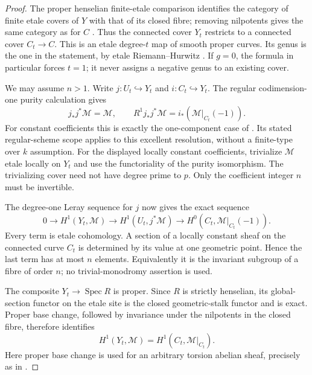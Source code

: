 \begin{proof}
The proper henselian finite-etale comparison identifies the
category of finite etale covers of $Y$ with that of its closed
fibre; removing nilpotents gives the same category as for $C$
\citep[Lemma 58.9.1, Tag 0A48, complete proof]
{StacksSemilinearDeterminantsB}. Thus the connected cover $Y_t$
restricts to a connected cover $C_t\to C$. This is an etale
degree-$t$ map of smooth proper curves. Its genus is the one in
the statement, by etale Riemann--Hurwitz
\citep[Section 53.12 and Lemma 53.12.2, Tags 0C1B and 0C1D]
{StacksSemilinearDeterminantsB}. If $g=0$, the formula in
particular forces $t=1$; it never assigns a negative genus to
an existing cover.

We may assume $n>1$. Write $j:U_t\hookrightarrow Y_t$ and
$i:C_t\hookrightarrow Y_t$. The regular codimension-one
purity calculation gives
\[
 j_*j^*\mathcal M=\mathcal M,\qquad
 R^1j_*j^*\mathcal M=i_*(\mathcal M|_{C_t}(-1)).          \tag{D.SD.3}
\]
For constant coefficients this is exactly the one-component
case of \citet[Expose XVI, Theorem 3.1.1 and
Corollary 3.1.3]{A_ILO2014}. Its stated regular-scheme scope
applies to this excellent resolution, without a finite-type
over $k$ assumption. For the displayed locally constant
coefficients, trivialize $\mathcal M$ etale locally on $Y_t$
and use the functoriality of the purity isomorphism. The
trivializing cover need not have degree prime to $p$.
Only the coefficient integer $n$ must be invertible.

The degree-one Leray sequence for $j$ now gives the exact sequence
\[
 0\longrightarrow H^1(Y_t,\mathcal M)
 \longrightarrow H^1(U_t,j^*\mathcal M)
 \longrightarrow H^0(C_t,\mathcal M|_{C_t}(-1)).          \tag{D.SD.4}
\]
Every term is etale cohomology. A section of a locally constant
sheaf on the connected curve $C_t$ is determined by its value
at one geometric point. Hence the last term has at most $n$
elements. Equivalently it is the invariant subgroup of a fibre
of order $n$; no trivial-monodromy assertion is used.

The composite $Y_t\to\operatorname{Spec}R$ is proper.
Since $R$ is strictly henselian, its global-section functor
on the etale site is the closed geometric-stalk functor and
is exact. Proper base change, followed by invariance under
the nilpotents in the closed fibre, therefore identifies
\[
          H^1(Y_t,\mathcal M)
             =H^1(C_t,\mathcal M|_{C_t}).                \tag{D.SD.5}
\]
Here proper base change is used for an arbitrary torsion
abelian sheaf, precisely as in
\citep[Theorem 59.91.11, Tag 095T, complete proof]
{StacksSemilinearDeterminantsB}.


\end{proof}
